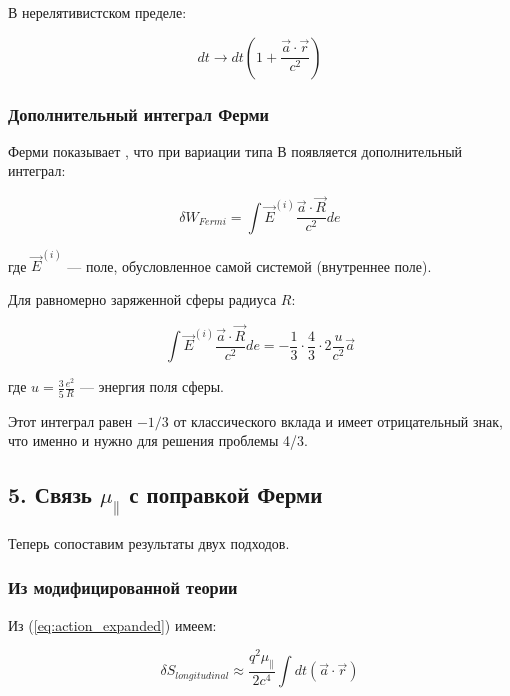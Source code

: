 \documentclass[12pt, a4paper]{article}
\begin{document}
В нерелятивистском пределе:

\begin{equation}
dt \longrightarrow dt \left(1 + \frac{\vec{a} \cdot \vec{r}}{c^2}\right)
\label{eq:time_fermi}
\end{equation}

\subsubsection{Дополнительный интеграл Ферми}

Ферми показывает \cite{Fermi1923, Fermi_solution}, что при вариации типа В появляется дополнительный интеграл:

\begin{equation}
\delta W_{Fermi} = \int \vec{E}^{(i)} \frac{\vec{a} \cdot \vec{R}}{c^2} de
\label{eq:fermi_integral}
\end{equation}

где $\vec{E}^{(i)}$ — поле, обусловленное самой системой (внутреннее поле).

Для равномерно заряженной сферы радиуса $R$:

\begin{equation}
\int \vec{E}^{(i)} \frac{\vec{a} \cdot \vec{R}}{c^2} de = -\frac{1}{3} \cdot \frac{4}{3} \cdot 2\frac{u}{c^2} \vec{a}
\label{eq:fermi_sphere}
\end{equation}

где $u = \frac{3}{5}\frac{e^2}{R}$ — энергия поля сферы.

Этот интеграл равен $-1/3$ от классического вклада и имеет отрицательный знак, что именно и нужно для решения проблемы 4/3.

\subsection{5. Связь $\mu_{\parallel}$ с поправкой Ферми}

Теперь сопоставим результаты двух подходов.

\subsubsection{Из модифицированной теории}

Из (\ref{eq:action_expanded}) имеем:

\begin{equation}
\delta S_{longitudinal} \approx \frac{q^2\mu_{\parallel}}{2c^4} \int dt \left(\vec{a} \cdot \vec{r}\right)
\label{eq:action_longitudinal_again}
\end{equation}
\end{document}
